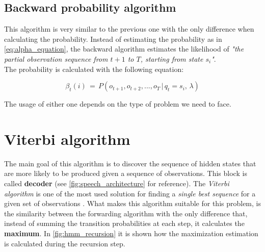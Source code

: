\subsection{Backward probability algorithm}
This algorithm is very similar to the previous one with the only difference when calculating the probability. Instead of estimating the probability as in \ref{eq:alpha_equation}, the backward algorithm estimates the likelihood of \textit{"the partial observation sequence from $t+1$ to $T$, starting from state $s_{i}$"}\cite{hmm_tutorial}. \\

\noindent The probability is calculated with the following equation:

\begin{equation}
\label{eq:backward_algorithm}
	\beta_{t}(i) \, = \, P(o_{t+1}, o_{t+2}, ... , o_{T} \, | \, q_{t} = s_{i}, \, \lambda)
\end{equation}

\noindent The usage of either one depends on the type of problem we need to face.


\section{Viterbi algorithm}
\label{sec:viterbi}
The main goal of this algorithm is to discover the sequence of hidden states that are more likely to be produced given a sequence of observations. This block is called \textbf{decoder} (see \ref{fig:speech_architecture} for reference). The \textit{Viterbi algorithm} is one of the most used solution for finding a \textit{single best sequence} for a given set of observations \cite{hmm_tutorial}. What makes this algorithm suitable for this problem, is the similarity between the forwarding algorithm with the only difference that, instead of summing the transition probabilities at each step, it calculates the \textbf{maximum}. In \ref{fig:hmm_recursion} it is shown how the maximization estimation is calculated during the recursion step.

